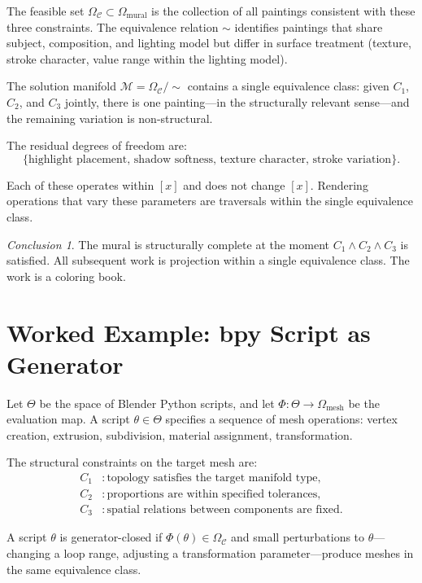 \documentclass[11pt, twoside]{article}
\theoremstyle{plain}
\theoremstyle{definition}
\theoremstyle{remark}
\newtheorem{conclusion}[theorem]{Conclusion}
\newcommand{\OmC}{\Omega_{\mathcal{C}}}
\begin{document}
The feasible set $\OmC \subset \Omega_{\text{mural}}$ is the collection of all paintings consistent with these three constraints. The equivalence relation $\sim$ identifies paintings that share subject, composition, and lighting model but differ in surface treatment (texture, stroke character, value range within the lighting model).

The solution manifold $\mathcal{M} = \OmC / {\sim}$ contains a single equivalence class: given $C_1$, $C_2$, and $C_3$ jointly, there is one painting---in the structurally relevant sense---and the remaining variation is non-structural.

The residual degrees of freedom are:
\[
\{ \text{highlight placement, shadow softness, texture character, stroke variation} \}.
\]

Each of these operates within $[x]$ and does not change $[x]$. Rendering operations that vary these parameters are traversals within the single equivalence class.

\begin{conclusion}
The mural is structurally complete at the moment $C_1 \wedge C_2 \wedge C_3$ is satisfied. All subsequent work is projection within a single equivalence class. The work is a coloring book.
\end{conclusion}

\section{Worked Example: bpy Script as Generator}
\label{app:bpy}

Let $\Theta$ be the space of Blender Python scripts, and let $\Phi : \Theta \to \Omega_{\text{mesh}}$ be the evaluation map. A script $\theta \in \Theta$ specifies a sequence of mesh operations: vertex creation, extrusion, subdivision, material assignment, transformation.

The structural constraints on the target mesh are:
\begin{align*}
C_1 &: \text{topology satisfies the target manifold type}, \\
C_2 &: \text{proportions are within specified tolerances}, \\
C_3 &: \text{spatial relations between components are fixed}.
\end{align*}

A script $\theta$ is generator-closed if $\Phi(\theta) \in \OmC$ and small perturbations to $\theta$---changing a loop range, adjusting a transformation parameter---produce meshes in the same equivalence class.
\end{document}
